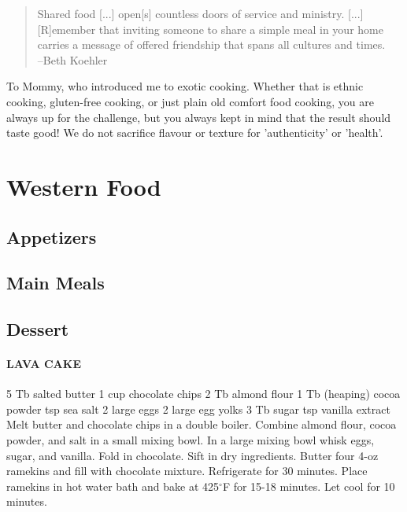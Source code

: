 \documentclass[oneside,11pt]{memoir} %
\begin{document}
\begin{quote}
Shared food [...] open[s] countless doors of service and ministry. [...] [R]emember that inviting someone to share a simple meal in your home carries a message of offered friendship that spans all cultures and times.\\
--Beth Koehler
\end{quote}

To Mommy, who introduced me to exotic cooking. Whether that is ethnic cooking, gluten-free cooking, or just plain old comfort food cooking, you are always up for the challenge, but you always kept in mind that the result should taste good! We do not sacrifice flavour or texture for 'authenticity' or 'health'.


\part{Western Food}

\chapter{Appetizers}
\chapter{Main Meals}
\chapter{Dessert}

\subsection{LAVA CAKE}  
	5 Tb salted butter	1 cup chocolate chips
	2 Tb almond flour	1 Tb (heaping) cocoa powder
	 tsp sea salt	2 large eggs
	2 large egg yolks	3 Tb sugar
	 tsp vanilla extract	
Melt butter and chocolate chips in a double boiler. Combine almond flour, cocoa powder, and salt in a small mixing bowl. In a large mixing bowl whisk eggs, sugar, and vanilla. Fold in chocolate. Sift in dry ingredients. Butter four 4-oz ramekins and fill with chocolate mixture. Refrigerate for 30 minutes. Place ramekins in hot water bath and bake at 425$^\circ$F for 15-18 minutes. Let cool for 10 minutes.
\end{document}
